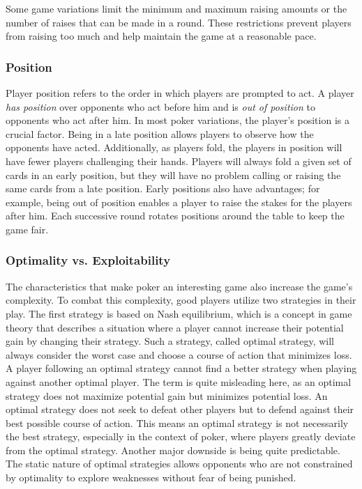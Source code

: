 Some game variations limit the minimum and maximum raising amounts or the number of raises that can be made in a round. These restrictions prevent players from raising too much and help maintain the game at a reasonable pace.


\subsubsection{Position}
Player position refers to the order in which players are prompted to act. A player \textit{has position} over opponents who act before him and is \textit{out of position} to opponents who act after him. In most poker variations, the player's position is a crucial factor. Being in a late position allows players to observe how the opponents have acted. Additionally, as players fold, the players in position will have fewer players challenging their hands. Players will always fold a given set of cards in an early position, but they will have no problem calling or raising the same cards from a late position. Early positions also have advantages; for example, being out of position enables a player to raise the stakes for the players after him. Each successive round rotates positions around the table to keep the game fair.




\subsubsection{Optimality vs. Exploitability}
The characteristics that make poker an interesting game also increase the game's complexity. To combat this complexity, good players utilize two strategies in their play. The first strategy is based on Nash equilibrium, which is a concept in game theory that describes a situation where a player cannot increase their potential gain by changing their strategy. Such a strategy, called optimal strategy, will always consider the worst case and choose a course of action that minimizes loss. A player following an optimal strategy cannot find a better strategy when playing against another optimal player. The term  is quite misleading here, as an optimal strategy does not maximize potential gain but minimizes potential loss. An optimal strategy does not seek to defeat other players but to defend against their best possible course of action. This means an optimal strategy is not necessarily the best strategy, especially in the context of poker, where players greatly deviate from the optimal strategy. Another major downside is being quite predictable. The static nature of optimal strategies allows opponents who are not constrained by optimality to explore weaknesses
without fear of being punished.

